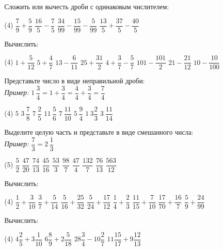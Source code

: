 %
%
%
%
\begin{class}[number=1]
	\begin{listofex}
		\item Сложить или вычесть дроби с одинаковым числителем:
		\begin{tasks}(4)
			\task \( \dfrac{7}{9}+\dfrac{5}{9} \)
			\task \( \dfrac{16}{5}-\dfrac{7}{5} \)
			\task \( \dfrac{34}{99}-\dfrac{15}{99}-\dfrac{5}{99} \)
			\task \( \dfrac{13}{5}+\dfrac{37}{5}-\dfrac{40}{5} \)
		\end{tasks}
		\item Вычислить:
		\begin{tasks}(4)
			\task \( 1+\dfrac{5}{12} \)
			\task \( 5+\dfrac{4}{7} \)
			\task \( 13-\dfrac{6}{11} \)
			\task \( 25+\dfrac{31}{2} \)
			\task \( 4+\dfrac{3}{7}-\dfrac{5}{7} \)
			\task \( 101-\dfrac{101}{2} \)
			\task \( 21-\dfrac{21}{12} \)
			\task \( 10-\dfrac{10}{100} \)
		\end{tasks}
		\item Представьте число в виде неправильной дроби:\\
		\textit{Пример:} \( 1\:\dfrac{3}{4}=1+\dfrac{3}{4}=\dfrac{4}{4}+\dfrac{3}{4}=\dfrac{7}{4} \)
		\begin{tasks}(4)
			\task \( 5 \)
			\task \( 3\:\dfrac{7}{8} \)
			\task \( 7\:\dfrac{2}{5} \)
			\task \( 11\:\dfrac{5}{6} \)
			\task \( 7\:\dfrac{11}{10} \)
			\task \( 5\:\dfrac{9}{4} \)
			\task \( 1\:3\dfrac{2}{3} \)
			\task \( 3\:\dfrac{11}{14} \)
		\end{tasks}
		\item Выделите целую часть и представьте в виде смешанного числа:\\
		\textit{Пример:} \( \dfrac{7}{3}=2\:\dfrac{1}{3} \)
		\begin{tasks}(5)
			\task \( \dfrac{5}{2} \)
			\task \( \dfrac{47}{20} \)
			\task \( \dfrac{74}{13} \)
			\task \( \dfrac{45}{16} \)
			\task \( \dfrac{53}{3} \)
			\task \( \dfrac{98}{7} \)
			\task \( \dfrac{47}{4} \)
			\task \( \dfrac{132}{7} \)
			\task \( \dfrac{76}{13} \)
			\task \( \dfrac{563}{12} \)
		\end{tasks}
		\item Вычислить:
		\begin{tasks}(4)
			\task \( \dfrac{1}{2}+\dfrac{3}{10} \)
			\task \( \dfrac{3}{7}+\dfrac{5}{14} \)
			\task \( \dfrac{5}{16}+\dfrac{25}{32} \)
			\task \( \dfrac{5}{24}+\dfrac{17}{12} \)
			\task \( \dfrac{1}{4}+\dfrac{2}{3} \)
			\task \( \dfrac{11}{15}+\dfrac{7}{10} \)
			\task \( \dfrac{17}{70}+\dfrac{16}{7} \)
			\task \( \dfrac{5}{9}+\dfrac{24}{99} \)
		\end{tasks}
		\item Вычислить:
		\begin{tasks}(4)
			\task \( 4\dfrac{2}{5}+3\dfrac{1}{10} \)
			\task \( 6\dfrac{8}{9}+2\dfrac{5}{18} \)
			\task \( 28\dfrac{3}{4}-10\dfrac{2}{7} \)
			\task \( 11\dfrac{15}{17}+9\dfrac{12}{13} \)
		\end{tasks}
	\end{listofex}
\end{class}
